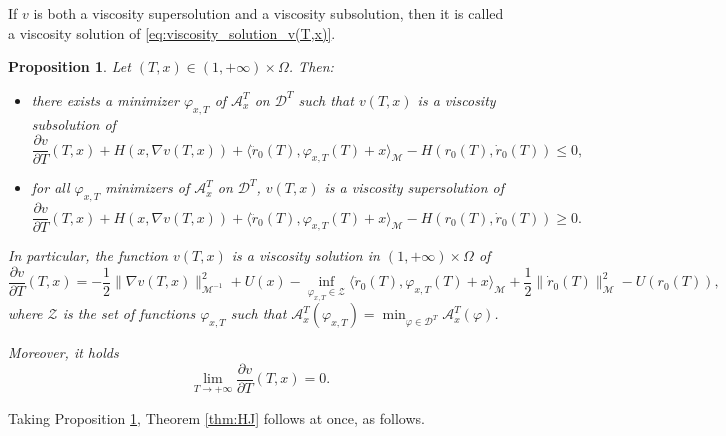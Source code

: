 \documentclass[a4paper,10pt]{amsart}
\theoremstyle{plain}
\newtheorem{prop}[thm]{Proposition}
\theoremstyle{definition}
\numberwithin{equation}{section}
\numberwithin{thm}{section}
\begin{document}
If $v$ is both a viscosity supersolution and a viscosity subsolution, then it is called a viscosity solution of \eqref{eq:viscosity_solution_v(T,x)}.

\begin{prop}
    \label{prop:HJ_v_T}
Let $(T,x)\in(1,+\infty)\times\Omega$. Then:
\begin{itemize}
    \item there exists a minimizer $\varphi_{x,T}$ of $\mathcal{A}_{x}^T$ on $\mathcal{D}^T$ such that $v(T,x)$ is a viscosity subsolution of
    \[
    \frac{\partial v}{\partial T}(T,x) + H(x,\nabla v(T,x)) +\langle\ddot{r}_0(T),\varphi_{x,T}(T)+x\rangle_\mathcal{M} - H(r_0(T),\dot r_0(T)) \le 0,
    \]
    \item for all $\varphi_{x,T}$ minimizers of $\mathcal{A}_{x}^T$ on $\mathcal{D}^T$, $v(T,x)$ is a viscosity supersolution of 
    \[
    \frac{\partial v}{\partial T}(T,x) + H(x,\nabla v(T,x)) +\langle\ddot{r}_0(T),\varphi_{x,T}(T)+x\rangle_\mathcal{M} - H(r_0(T),\dot r_0(T)) \ge 0.
    \]
\end{itemize}
In particular, the function $v(T,x)$ is a viscosity solution in $(1,+\infty)\times\Omega$ of
\begin{displaymath}
    \label{eq:v_T}
\frac{\partial v}{\partial T}(T,x) = -\frac{1}{2}\|\nabla v(T,x)\|^2_{\mathcal{M}^{-1}} + U(x) - \inf_{\varphi_{x,T} \in \mathcal{Z}}\langle\ddot{r}_0(T),\varphi_{x,T}(T)+x\rangle_\mathcal{M}+\frac{1}{2}\|\dot r_0(T)\|_\mathcal{M}^2 - U(r_0(T)), 
\end{displaymath}
where $\mathcal{Z}$ is the set of functions $\varphi_{x,T}$ such that $\mathcal{A}_{x}^T(\varphi_{x,T})=  \min_{\varphi\in\mathcal{D}^T}\mathcal{A}_{x}^T(\varphi)$.

Moreover, it holds
\begin{equation}
    \label{eq:pa_T_v}
\lim_{T\to +\infty} \frac{\partial v}{\partial T}(T,x)=0.
\end{equation}
\end{prop}

Taking Proposition \ref{prop:HJ_v_T}, Theorem \ref{thm:HJ} follows at once, as follows.
\end{document}
